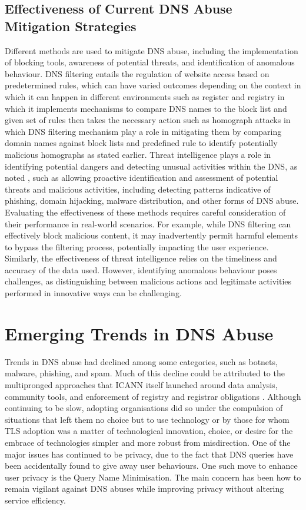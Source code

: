 \subsection{Effectiveness of Current DNS Abuse Mitigation Strategies}

Different methods are used to mitigate DNS abuse, including the implementation of blocking tools, awareness of potential threats, and identification of anomalous behaviour. DNS filtering entails the regulation of website access based on predetermined rules, which can have varied outcomes depending on the context in which it can happen in different environments such as register and registry in which it implements mechanisms to compare DNS names to the block list and given set of rules then takes the necessary action such as homograph attacks in which DNS filtering mechanism play a role in mitigating them by comparing domain names against block lists and predefined rule to identify potentially malicious homographs as stated earlier. Threat intelligence plays a role in identifying potential dangers and detecting unusual activities within the DNS, as noted \cite{rizvi2022application}, such as allowing proactive identification and assessment of potential threats and malicious activities, including detecting patterns indicative of phishing, domain hijacking, malware distribution, and other forms of DNS abuse. Evaluating the effectiveness of these methods requires careful consideration of their performance in real-world scenarios. For example, while DNS filtering can effectively block malicious content, it may inadvertently permit harmful elements to bypass the filtering process, potentially impacting the user experience. Similarly, the effectiveness of threat intelligence relies on the timeliness and accuracy of the data used. However, identifying anomalous behaviour poses challenges, as distinguishing between malicious actions and legitimate activities performed in innovative ways can be challenging.


\section{Emerging Trends in DNS Abuse}

Trends in DNS abuse had declined among some categories, such as botnets, malware, phishing, and spam. Much of this decline could be attributed to the multipronged approaches that ICANN itself launched around data analysis, community tools, and enforcement of registry and registrar obligations \cite{icann_dns_security_threat}. Although continuing to be slow, adopting organisations did so under the compulsion of situations that left them no choice but to use technology or by those for whom TLS adoption was a matter of technological innovation, choice, or desire for the embrace of technologies simpler and more robust from misdirection. One of the major issues has continued to be privacy, due to the fact that DNS queries have been accidentally found to give away user behaviours. One such move to enhance user privacy is the Query Name Minimisation. The main concern has been how to remain vigilant against DNS abuses while improving privacy without altering service efficiency.

